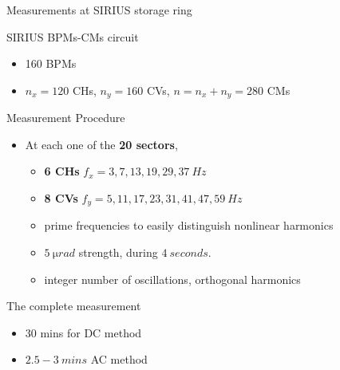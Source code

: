 \documentclass[aspectratio=169]{beamer}
\begin{document}
\begin{frame}{Measurements at SIRIUS storage ring}
    \begin{minipage}{0.49\textwidth}
        \scriptsize
        SIRIUS BPMs-CMs circuit
        \begin{itemize}
            \item 160 BPMs
            \item $n_x = 120$ CHs, $n_y=160$ CVs, $n=n_x+n_y=280$ CMs
        \end{itemize}
        \pause
        Measurement Procedure
        \begin{itemize}
            \item At each one of the \textbf{20 sectors},
            \begin{itemize}
            \scriptsize
            \item \textbf{6 CHs} $f_x = 3,  7, 13, 19, 29, 37\ \unit{Hz}$
            \item \textbf{8 CVs} $f_y = 5, 11, 17, 23, 31, 41, 47, 59\ \unit{Hz}$
            \item prime frequencies to easily distinguish nonlinear harmonics
            \item $\unit{5~\micro rad}$ strength, during $\unit{4~seconds}$.
            \item integer number of oscillations, orthogonal harmonics
            \end{itemize}
        \end{itemize}
        \pause
        The complete measurement
        \begin{itemize}
            \scriptsize
            \item 30 mins for DC method
            \item $2.5-3\ \unit{mins}$ AC method
        \end{itemize}
    \pause
    \end{minipage}
    \pause
    \hfill
    \begin{minipage}{0.49\textwidth}

\end{minipage}
\end{frame}
\end{document}
